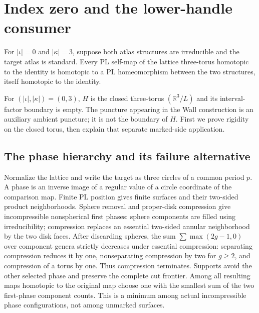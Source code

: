 \section{Index zero and the lower-handle consumer}
\label{sec:relative-rigidity-index-zero}
\label{sec:index-zero-final}

\begin{theorem}
\label{thm:rigidity-index-zero}
For $|\iota|=0$ and $|\kappa|=3$, suppose both atlas structures are
irreducible and the target atlas is standard. Every PL self-map of the
lattice three-torus homotopic to the identity is homotopic to a PL
homeomorphism between the two structures, itself homotopic to the identity.
\end{theorem}

For $(|\iota|,|\kappa|)=(0,3)$, $H$ is the closed three-torus
$(\mathbb R^3/L)$ and its interval-factor boundary is empty.  The puncture
appearing in the Wall construction is an auxiliary ambient puncture; it is
not the boundary of $H$. First we prove rigidity on the closed torus, then
explain that separate marked-side application.

\subsection{The phase hierarchy and its failure alternative}

Normalize the lattice and write the target as three circles of a common
period $p$. A phase is an inverse image of a regular value of a circle
coordinate of the comparison map. Finite PL position gives finite
surfaces and their two-sided product neighborhoods. Sphere removal and
proper-disk compression give incompressible nonspherical first phases:
sphere components are filled using irreducibility; compression replaces
an essential two-sided annular neighborhood by the two disk faces.
After discarding spheres, the sum $\sum\max(2g-1,0)$ over component
genera strictly decreases under essential compression: separating
compression reduces it by one, nonseparating compression by two for
$g\geq2$, and compression of a torus by one. Thus compression terminates.
Supports avoid the other selected phase and preserve the
complete cut frontier. Among all resulting maps homotopic to the original
map choose one with the smallest sum of the two first-phase component
counts. This is a minimum among actual incompressible phase configurations,
not among unmarked surfaces.

